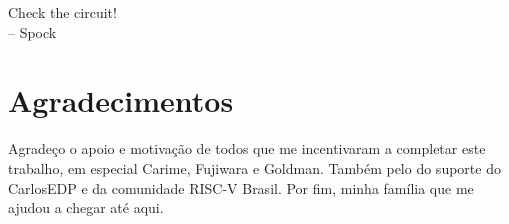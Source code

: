 

\begin{dedicatoria}
    Check the circuit! \\
    – Spock
    \end{dedicatoria}
    
    
    \chapter*{Agradecimentos}
    
    Agradeço o apoio e motivação de todos que me incentivaram a completar 
    este trabalho, em especial Carime, Fujiwara e Goldman. 
    Também pelo do suporte do CarlosEDP e da comunidade RISC-V Brasil.
    Por fim, minha família que me ajudou a chegar até aqui.
    
    \printResumoAbstract
    
    
    
    \makeatletter
    \if@openright\cleardoublepage\else\clearpage\fi
    \makeatother
    
    
